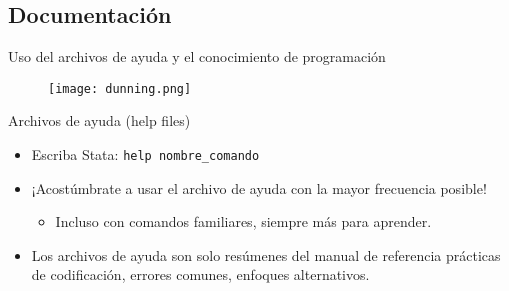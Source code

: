 \documentclass[11pt, aspectratio=169, compress]{beamer}
\begin{document}
\subsection{Documentación}
\begin{frame}{Uso del archivos de ayuda y el conocimiento de programación}
	\begin{figure}[H]
		\centering
		\texttt{[image: dunning.png]}
	\end{figure}	
\end{frame}
\begin{frame}{Archivos de ayuda (help files)}
	\begin{itemize}
		\item Escriba Stata: \texttt{help nombre\_comando} 
		\item ¡Acostúmbrate a usar el archivo de ayuda con la mayor frecuencia posible!
		\begin{itemize}
			\item Incluso con comandos familiares, siempre más para aprender.
		\end{itemize}
		\item Los archivos de ayuda son solo resúmenes del manual de referencia prácticas de codificación, errores comunes, enfoques alternativos.
	\end{itemize}
\end{frame}
\end{document}

